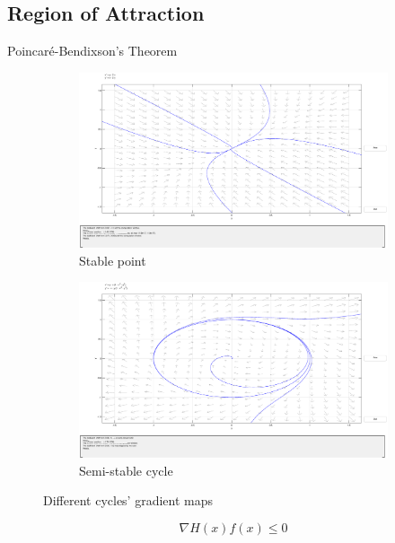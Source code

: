 \subsection{Region of Attraction}%
\label{subsec:roa}

\begin{slide}{Poincaré-Bendixson's Theorem}
  \begin{figure}[!htb]
    \centering
    \begin{subfigure}[b]{0.45\linewidth}
      \centering
      \includegraphics[trim=116 155 125 55,clip,width=\linewidth]{imgs/stable-point}
      \caption{Stable point}%
      \label{fig:stable-point}
    \end{subfigure}
    \begin{subfigure}[b]{0.45\linewidth}
      \centering
      \includegraphics[trim=116 155 125 55,clip,width=\linewidth]{imgs/semi-stable-cycle}
      \caption{Semi-stable cycle}%
      \label{fig:semi-stable-cycle}
    \end{subfigure}
    \caption{Different cycles' gradient maps}%
    \label{fig:poincare-cycles}
  \end{figure}
  \begin{equation}
    \nabla{}H(x)f(x) \leq 0
  \end{equation}
\end{slide}

